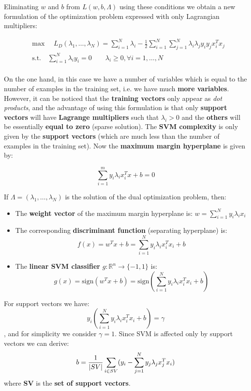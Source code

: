 Eliminating $w$ and $b$ from $L(w,b,\Lambda)$ using these conditions we obtain a new formulation of the optimization problem expressed with only Lagrangian multipliers:

\begin{equation*}
\begin{aligned}
&\text{max }\quad L_D(\lambda_1,\dots,\lambda_N) = \sum_{i = 1}^{N}\lambda_i - \frac{1}{2}\sum_{i = 1}^{N}\sum_{j = 1}^{N}\lambda_i\lambda_jy_iy_jx_i^Tx_j\\
&\text{s.t.} \quad \sum_{i = 1}^{N}\lambda_iy_i= 0 \qquad \lambda_i \geq 0, \forall i = 1,\dots,N\\
\end{aligned}
\end{equation*}

On the one hand, in this case we have a number of variables which is equal to the number of examples in the training set, i.e. we have much \textbf{more variables}. However, it can be noticed that the \textbf{training vectors} only appear as \textit{dot products}, and the advantage of using this formulation is that only \textbf{support vectors} will have \textbf{Lagrange multipliers} such that $\lambda_i > 0$ and the \textbf{others} will be essentially \textbf{equal to zero} (sparse solution). The \textbf{SVM complexity} is only given by the \textbf{support vectors} (which are much less than the number of examples in the training set). Now the \textbf{maximum margin hyperplane} is given by:

$$\sum_{i = 1}^{m} y_i \lambda_ix_i^Tx+b = 0$$

If $\Lambda = (\lambda_1,\dots, \lambda_N)$ is the solution of the dual optimization problem, then:
\begin{itemize}
	\item The \textbf{weight vector} of the maximum margin hyperplane is:
	$w = \sum_{i = 1}^{N} y_i\lambda_ix_i$
	\item The corresponding \textbf{discriminant function} (separating hyperplane) is:
	$$f(x) = w^Tx+b =  \sum_{i = 1}^{N} y_i\lambda_ix_i^Tx_i + b$$
	\item The \textbf{linear SVM classifier} $g: \mathbb{R}^n \rightarrow \{-1,1\}$ is:
	$$g(x) = \text{sign}(w^Tx+b) = \text{sign} (\sum_{i = 1}^{N} y_i\lambda_ix_i^Tx_i + b)$$
\end{itemize}
For support vectors we have:
$$y_i(\sum_{i = 1}^{N} y_i\lambda_ix_i^Tx_i + b) = \gamma$$
, and for simplicity we consider $\gamma = 1$.
Since SVM is affected only by support vectors we can derive:
$$b = \frac{1}{|SV|}\sum_{i\in SV}\Large(y_i-\sum_{j=1}^{N}y_j\lambda_jx_j^Tx_i\Large)$$
where \textbf{SV} is the \textbf{set of support vectors}.

